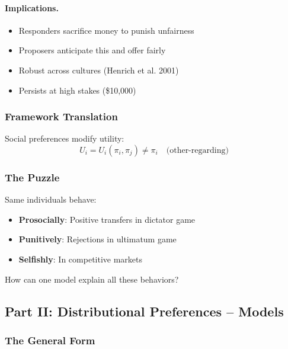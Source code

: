 \paragraph{Implications.}
\begin{itemize}
    \item Responders sacrifice money to punish unfairness
    \item Proposers anticipate this and offer fairly
    \item Robust across cultures (Henrich et al. 2001)
    \item Persists at high stakes (\$10,000)
\end{itemize}

\subsubsection{Framework Translation}

Social preferences modify utility:
\begin{equation}
U_i = U_i(\pi_i, \pi_j) \neq \pi_i \quad \text{(other-regarding)}
\end{equation}

\subsubsection{The Puzzle}

Same individuals behave:
\begin{itemize}
    \item \textbf{Prosocially}: Positive transfers in dictator game
    \item \textbf{Punitively}: Rejections in ultimatum game
    \item \textbf{Selfishly}: In competitive markets
\end{itemize}

How can one model explain all these behaviors?

\subsection{Part II: Distributional Preferences – Models}

\subsubsection{The General Form}

